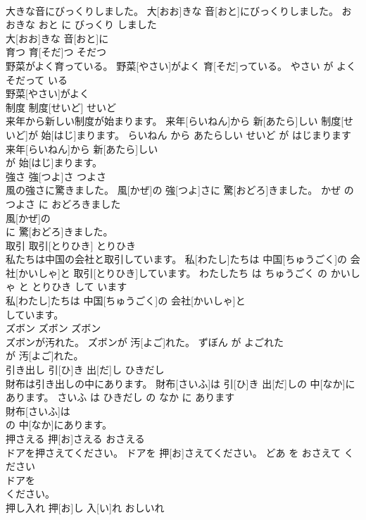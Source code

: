 \documentclass[8pt]{extreport}
\begin{document}
\begin{CJK}{UTF8}{min}
\\	大きな音にびっくりしました。	大[おお]きな 音[おと]にびっくりしました。	おおきな おと に びっくり しました	
\\	大[おお]きな 音[おと]に
\\	育つ	育[そだ]つ	そだつ	
\\	野菜がよく育っている。	野菜[やさい]がよく 育[そだ]っている。	やさい が よく そだって いる	
\\	野菜[やさい]がよく
\\	制度	制度[せいど]	せいど	
\\	来年から新しい制度が始まります。	来年[らいねん]から 新[あたら]しい 制度[せいど]が 始[はじ]まります。	らいねん から あたらしい せいど が はじまります	
\\	来年[らいねん]から 新[あたら]しい
\\	が 始[はじ]まります。		
\\	強さ	強[つよ]さ	つよさ	
\\	風の強さに驚きました。	風[かぜ]の 強[つよ]さに 驚[おどろ]きました。	かぜ の つよさ に おどろきました	
\\	風[かぜ]の
\\	に 驚[おどろ]きました。		
\\	取引	取引[とりひき]	とりひき	
\\	私たちは中国の会社と取引しています。	私[わたし]たちは 中国[ちゅうごく]の 会社[かいしゃ]と 取引[とりひき]しています。	わたしたち は ちゅうごく の かいしゃ と とりひき して います	
\\	私[わたし]たちは 中国[ちゅうごく]の 会社[かいしゃ]と
\\	しています。		
\\	ズボン	ズボン	ズボン	
\\	ズボンが汚れた。	ズボンが 汚[よご]れた。	ずぼん が よごれた	
\\	が 汚[よご]れた。		
\\	引き出し	引[ひ]き 出[だ]し	ひきだし	
\\	財布は引き出しの中にあります。	財布[さいふ]は 引[ひ]き 出[だ]しの 中[なか]にあります。	さいふ は ひきだし の なか に あります	
\\	財布[さいふ]は
\\	の 中[なか]にあります。		
\\	押さえる	押[お]さえる	おさえる	
\\	ドアを押さえてください。	ドアを 押[お]さえてください。	どあ を おさえて ください	
\\	ドアを
\\	ください。		
\\	押し入れ	押[お]し 入[い]れ	おしいれ	

\end{CJK}
\end{document}
